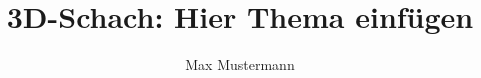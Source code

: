 \documentclass{../3dchess}
\title{3D-Schach: Hier Thema einfügen}
\author{Max Mustermann}
\begin{document}
  \maketitle  
  
  \tableofcontents
    
  
  
  
  
    
  \appendix
  
  
  \nocite{*}
\end{document}
